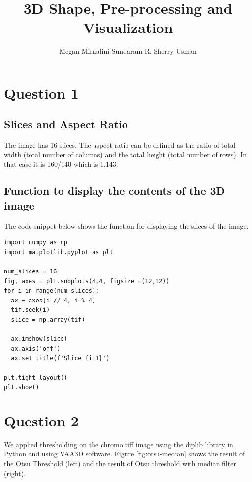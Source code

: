 \documentclass{article}
\title{3D Shape, Pre-processing and Visualization}
\author{Megan Mirnalini Sundaram R, Sherry Usman}
\begin{document}
\maketitle



\section*{Question 1}
\subsection*{Slices and Aspect Ratio}
The image has 16 slices. The aspect ratio can be defined as the ratio of total width (total number of columns) and the total height (total number of rows). In that case it is 160/140 which is 1.143. 

\subsection*{Function to display the contents of the 3D image}
The code snippet below shows the function for displaying the slices of the image.  
\begin{lstlisting}
import numpy as np
import matplotlib.pyplot as plt 

num_slices = 16
fig, axes = plt.subplots(4,4, figsize =(12,12))
for i in range(num_slices):
  ax = axes[i // 4, i % 4]
  tif.seek(i)
  slice = np.array(tif)

  ax.imshow(slice)
  ax.axis('off')
  ax.set_title(f'Slice {i+1}')

plt.tight_layout()
plt.show()
\end{lstlisting}


\section*{Question 2}
We applied thresholding on the chromo.tiff image using the diplib library in Python and using VAA3D software. Figure \ref{fig:otsu-median} shows the result of the Otsu Threshold (left) and the result of Otsu threshold with median filter (right). 
\end{document}
